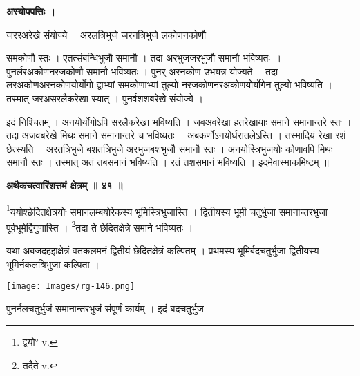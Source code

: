 \documentclass[11pt, openany]{book}
\begin{document}
\begin{center}
\textbf{अस्योपपत्तिः ।}
\end{center}
\vspace{3mm}

जररअरेखे संयोज्ये । अरलत्रिभुजे जरनत्रिभुजे लकोणनकोणौ

\newpage
\noindent समकोणौ स्तः । एतत्संबन्धिभुजौ समानौ । तदा अरभुजजरभुजौ
समानौ भविष्यतः~। पुनर्लरअकोणनरजकोणौ समानौ भविष्यतः । पुनर् अरनकोण उभयत्र योज्यते । तदा लरअकोणअरनकोणयोर्योगो द्वाभ्यां समकोणाभ्यां तुल्यो नरजकोणनरअकोणयोर्योगेन तुल्यो भविष्यति । तस्मात् जरअसरलैकरेखा स्यात् । पुनर्वशशबरेखे संयोज्ये ।\\
\vspace{5mm}

इदं निश्चितम् । अनयोर्योगोऽपि सरलैकरेखा भविष्यति । जबअवरेखा हतरेखायाः समाने समानान्तरे स्तः । तदा अजवबरेखे मिथः समाने समानान्तरे च भविष्यतः । अबकर्णोऽनयोर्धरातलेऽस्ति । तस्मादियं रेखा रशं छेत्स्यति । अरतत्रिभुजे बशतत्रिभुजे अरभुजबशभुजौ समानौ स्तः । अनयोस्त्रिभुजयोः कोणावपि मिथः समानौ स्तः । तस्मात् अतं तबसमानं भविष्यति । रतं तशसमानं भविष्यति ।
इदमेवास्माकमिष्टम् ॥\\
\vspace{5mm}

\begin{center}
\textbf{\large अथैकचत्वारिंशत्तमं क्षेत्रम् ॥ ४१ ॥}
\end{center}
\vspace{3mm}

{\ab \renewcommand{\thefootnote}{१}\footnote{द्वयो° {\en v.}}ययोश्छेदितक्षेत्रयोः समानलम्बयोरेकस्य भूमिस्त्रिभुजास्ति । द्वितीयस्य भूमी चतुर्भुजा समानान्तरभुजा पूर्वभूमेर्द्विगुणास्ति । \renewcommand{\thefootnote}{२}\footnote{तदैते {\en v.}}तदा ते छेदितक्षेत्रे समाने भविष्यतः ।}\\
\vspace{5mm}

यथा अबजदहझक्षेत्रं वतकलमनं द्वितीयं छेदितक्षेत्रं कल्पितम्
। प्रथमस्य भूमिर्बदचतुर्भुजा द्वितीयस्य भूमिर्नकलत्रिभुजा कल्पिता ।
\begin{center}
\noindent \texttt{[image: Images/rg-146.png]}  
\end{center}
पुनर्नलचतुर्भुजं समानान्तरभुजं संपूर्णं कार्यम् । इदं
बदचतुर्भुज-
\end{document}
